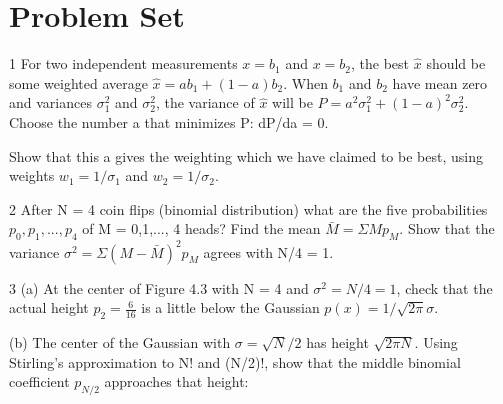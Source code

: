 \section{Problem Set}
1\; For two independent measurements $x= b_1$ and $x= b_2$, the best $\hat{x}$ should be some
weighted average $\hat{x}=ab_1+(1-a)b_2$. When $b_1$ and $b_2$ have mean zero and
variances $\sigma^2_1$ and $\sigma^2_2$, the variance of $\hat{x}$ will be $P=a^2\sigma^2_1+(1-a)^2\sigma^2_2$. Choose the number a that minimizes P: dP/da = 0.

Show that this a gives the weighting which we have claimed to be best, using weights
$w_1=1/\sigma_1$ and $w_2=1/\sigma_2$.

2\; After N = 4 coin flips (binomial distribution) what are the five probabilities $p_0,p_1,...,p_4$ of M = 0,1,..., 4 heads? Find the mean $\bar{M}=\Sigma Mp_M$.
Show that the variance $\sigma^2=\Sigma(M-\bar{M})^2 p_M$ agrees with N/4 = 1.

3\; (a) At the center of Figure 4.3 with N = 4 and $\sigma^2=N/4 = 1$, check that the actual
height $p_2=\frac{6}{16}$ is a little below the Gaussian $p(x)=1/\sqrt{2\pi}\sigma$.

(b) The center of the Gaussian with $\sigma=\sqrt{N}/2$ has height $\sqrt{2\pi N}$. Using Stirling's approximation to N! and (N/2)!, show that the middle binomial coefficient $p_{N/2}$
approaches that height: 
